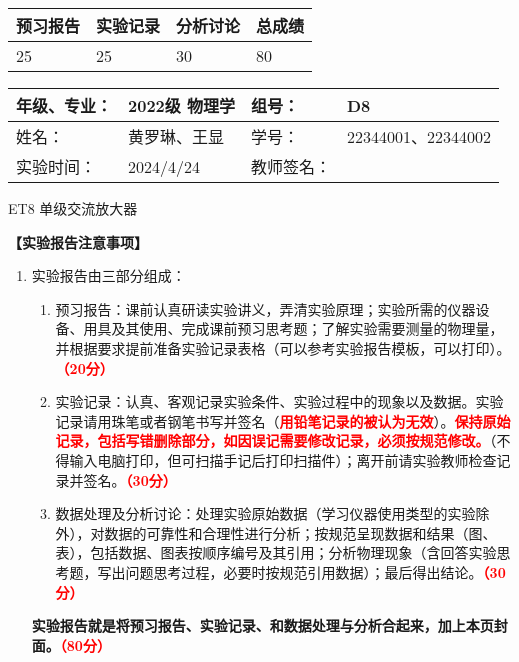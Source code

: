 \documentclass[dvipsnames, svgnames,a4paper,11pt]{article}
\begin{document}
	
	\begin{table}
		\renewcommand\arraystretch{1.7}
		\begin{tabularx}{\textwidth}{
				|X|X|X|X
				|X|X|X|X|}
			\hline
			\multicolumn{2}{|c|}{预习报告}&\multicolumn{2}{|c|}{实验记录}&\multicolumn{2}{|c|}{分析讨论}&\multicolumn{2}{|c|}{总成绩}\\
			\hline
			\LARGE25 & & \LARGE25 & & \LARGE30 & & \LARGE80 & \\
			\hline
		\end{tabularx}
	\end{table}
	
	\begin{table}
		\renewcommand\arraystretch{1.7}
		\begin{tabularx}{\textwidth}{|X|X|X|X|}
			\hline
			年级、专业： & 2022级 物理学 &组号： & D8\\
			\hline
			姓名： & 黄罗琳、王显   & 学号： &22344001、22344002   \\
			\hline
			实验时间： & 2024/4/24 & 教师签名： & \\
			\hline
		\end{tabularx}
	\end{table}
	
	\begin{center}
		\LARGE ET8 \quad 单级交流放大器
	\end{center}
	
	
	\textbf{【实验报告注意事项】}
	\begin{enumerate}
		\item 实验报告由三部分组成：
		\begin{enumerate}
			\item 预习报告：课前认真研读实验讲义，弄清实验原理；实验所需的仪器设备、用具及其使用、完成课前预习思考题；了解实验需要测量的物理量，并根据要求提前准备实验记录表格（可以参考实验报告模板，可以打印）。\textcolor{red}{\textbf{（20分）}}
			\item 实验记录：认真、客观记录实验条件、实验过程中的现象以及数据。实验记录请用珠笔或者钢笔书写并签名（\textcolor{red}{\textbf{用铅笔记录的被认为无效}}）。\textcolor{red}{\textbf{保持原始记录，包括写错删除部分，如因误记需要修改记录，必须按规范修改。}}（不得输入电脑打印，但可扫描手记后打印扫描件）；离开前请实验教师检查记录并签名。\textcolor{red}{\textbf{（30分）}}
			\item 数据处理及分析讨论：处理实验原始数据（学习仪器使用类型的实验除外），对数据的可靠性和合理性进行分析；按规范呈现数据和结果（图、表），包括数据、图表按顺序编号及其引用；分析物理现象（含回答实验思考题，写出问题思考过程，必要时按规范引用数据）；最后得出结论。\textcolor{red}{\textbf{（30分）}}
		\end{enumerate}
		\textbf{实验报告就是将预习报告、实验记录、和数据处理与分析合起来，加上本页封面。\textcolor{red}{（80分）}}
	
\end{enumerate}
	
\end{document}
